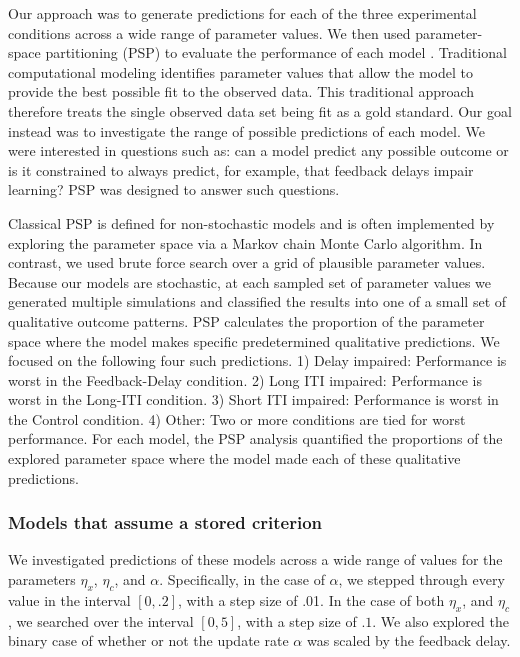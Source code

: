 \documentclass[doc, floatsintext]{apa7}
\begin{document}
Our approach was to generate predictions for each of the
three experimental conditions across a wide range of
parameter values. We then used parameter-space partitioning
(PSP) to evaluate the performance of each model
\parencite{pitt2006global}. Traditional computational
modeling identifies parameter values that allow the model to
provide the best possible fit to the observed data. This
traditional approach therefore treats the single observed
data set being fit as a gold standard. Our goal instead was
to investigate the range of possible predictions of each
model. We were interested in questions such as: can a model
predict any possible outcome or is it constrained to always
predict, for example, that feedback delays impair learning?
PSP was designed to answer such questions.

Classical PSP is defined for non-stochastic models and is
often implemented by exploring the parameter space via a
Markov chain Monte Carlo algorithm. In contrast, we used
brute force search over a grid of plausible parameter
values. Because our models are stochastic, at each sampled
set of parameter values we generated multiple simulations
and classified the results into one of a small set of
qualitative outcome patterns. PSP calculates the proportion
of the parameter space where the model makes specific
predetermined qualitative predictions. We focused on the
following four such predictions. 1) Delay impaired:
Performance is worst in the Feedback-Delay condition. 2)
Long ITI impaired: Performance is worst in the Long-ITI
condition. 3) Short ITI impaired: Performance is worst in
the Control condition. 4) Other: Two or more conditions are
tied for worst performance. For each model, the PSP analysis
quantified the proportions of the explored parameter space
where the model made each of these qualitative predictions.

\subsubsection{Models that assume a stored criterion}
We investigated predictions of these models across a wide
range of values for the parameters $\eta_{x}$, $\eta_{c}$,
and $\alpha$.  Specifically, in the case of $\alpha$,  we
stepped through every value in the interval $[0, .2]$, with
a step size of .01.  In the case of both $\eta_{x}$, and
$\eta_{c}$, we searched over the interval $[0, 5]$, with a
step size of $.1$.  We also explored the binary case of
whether or not the update rate $\alpha$ was scaled by the
feedback delay. 
\end{document}
